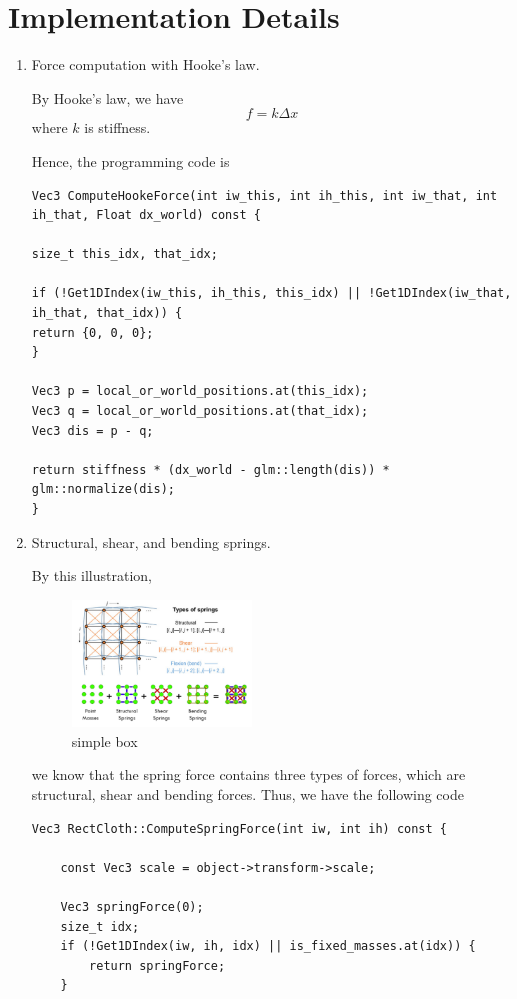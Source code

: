\documentclass[acmtog]{acmart}
\begin{document}
\section{Implementation Details}
\begin{enumerate}
	\setlength{\parindent}{2em}
	\item Force computation with Hooke's law.
	\par By Hooke's law, we have 
	\[f = k \Delta x\]
	where $k$ is stiffness.
	\par Hence, the programming code is 
	\begin{lstlisting}
Vec3 ComputeHookeForce(int iw_this, int ih_this, int iw_that, int ih_that, Float dx_world) const {

size_t this_idx, that_idx;

if (!Get1DIndex(iw_this, ih_this, this_idx) || !Get1DIndex(iw_that, ih_that, that_idx)) {
return {0, 0, 0};
}

Vec3 p = local_or_world_positions.at(this_idx);
Vec3 q = local_or_world_positions.at(that_idx);
Vec3 dis = p - q;

return stiffness * (dx_world - glm::length(dis)) * glm::normalize(dis);
}		
	\end{lstlisting}
	\item Structural, shear, and bending springs.
	\par By this illustration,
	\begin{figure}[H]
	\centering
	\includegraphics[width=0.45\textwidth]{images/hook_force.png}
	\caption{simple box}
	\end{figure}
	\par we know that the spring force contains three types of forces, which are structural, shear and bending forces. Thus, we have the following code
	\begin{lstlisting}
Vec3 RectCloth::ComputeSpringForce(int iw, int ih) const {

	const Vec3 scale = object->transform->scale;

	Vec3 springForce(0);
	size_t idx;
	if (!Get1DIndex(iw, ih, idx) || is_fixed_masses.at(idx)) {
		return springForce;
	}


\end{lstlisting}
\end{enumerate}
\end{document}
